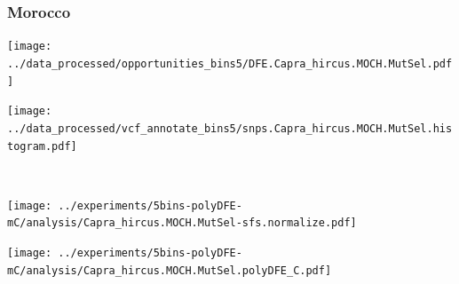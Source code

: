 \subsubsection{Morocco}

\begin{minipage}{0.49\linewidth}
    \texttt{[image: ../data\_processed/opportunities\_bins5/DFE.Capra\_hircus.MOCH.MutSel.pdf]}
\end{minipage}
\begin{minipage}{0.49\linewidth}
    \texttt{[image: ../data\_processed/vcf\_annotate\_bins5/snps.Capra\_hircus.MOCH.MutSel.histogram.pdf]}
\end{minipage}
\\
\begin{minipage}{0.49\linewidth}
    \texttt{[image: ../experiments/5bins-polyDFE-mC/analysis/Capra\_hircus.MOCH.MutSel-sfs.normalize.pdf]}
\end{minipage}
\begin{minipage}{0.4\linewidth}
    \texttt{[image: ../experiments/5bins-polyDFE-mC/analysis/Capra\_hircus.MOCH.MutSel.polyDFE\_C.pdf]}
\end{minipage}
